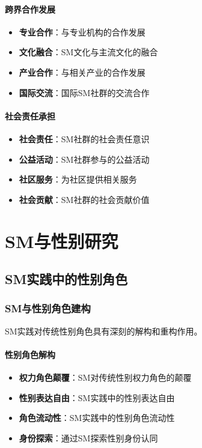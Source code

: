 \documentclass[12pt,UTF8]{ctexbook}
\begin{document}
\subsection{跨界合作发展}
\begin{itemize}[leftmargin=2cm]
	\item \textbf{专业合作}：与专业机构的合作发展
	\item \textbf{文化融合}：SM文化与主流文化的融合
	\item \textbf{产业合作}：与相关产业的合作发展
	\item \textbf{国际交流}：国际SM社群的交流合作
\end{itemize}

\subsection{社会责任承担}
\begin{itemize}[leftmargin=2cm]
	\item \textbf{社会责任}：SM社群的社会责任意识
	\item \textbf{公益活动}：SM社群参与的公益活动
	\item \textbf{社区服务}：为社区提供相关服务
	\item \textbf{社会贡献}：SM社群的社会贡献价值
\end{itemize}

\part{SM与性别研究}

\chapter{SM实践中的性别角色}
\section{SM与性别角色建构}
SM实践对传统性别角色具有深刻的解构和重构作用。

\subsection{性别角色解构}
\begin{itemize}[leftmargin=2cm]
	\item \textbf{权力角色颠覆}：SM对传统性别权力角色的颠覆
	\item \textbf{性别表达自由}：SM实践中的性别表达自由
	\item \textbf{角色流动性}：SM实践中的性别角色流动性
	\item \textbf{身份探索}：通过SM探索性别身份认同
\end{itemize}
\end{document}
